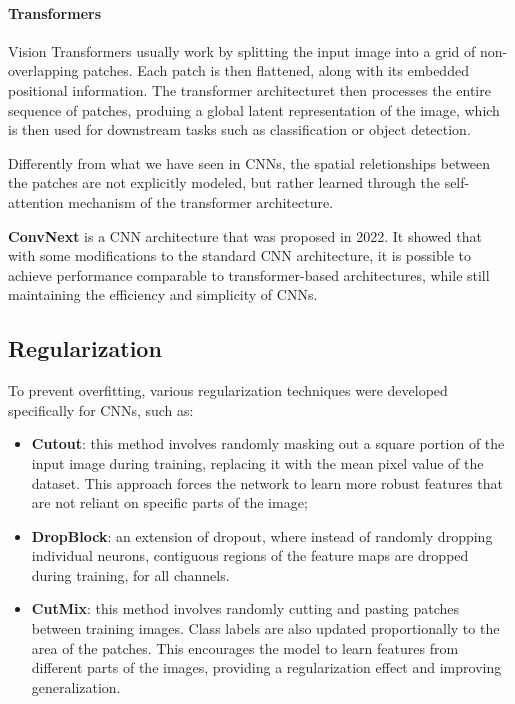 \paragraph{Transformers}
Vision Transformers usually work by splitting the input image into a grid of non-overlapping patches.
Each patch is then flattened, along with its embedded positional information. The transformer architecturet
then processes the entire sequence of patches, produing a global latent representation of the image, which
is then used for downstream tasks such as classification or object detection.

Differently from what we have seen in CNNs, the spatial reletionships between the patches are not explicitly modeled, but rather learned through the self-attention mechanism of the transformer architecture.

\textbf{ConvNext} is a CNN architecture that was proposed in 2022. It showed that with some modifications to the standard CNN architecture, it is possible to achieve performance 
comparable to transformer-based architectures, while still maintaining the efficiency and simplicity of CNNs.

\subsection{Regularization}
To prevent overfitting, various regularization techniques were developed specifically for CNNs, such as:
\begin{itemize}
    \item \textbf{Cutout}: this method involves randomly masking out a square portion of the input image during training, replacing it with the mean pixel value of the dataset.
    This approach forces the network to learn more robust features that are not reliant on specific parts of the image;
    \item \textbf{DropBlock}: an extension of dropout, where instead of randomly dropping individual neurons, contiguous regions of the feature maps are dropped during training,
    for all channels.
    \item \textbf{CutMix}: this method involves randomly cutting and pasting patches between training images.
    Class labels are also updated proportionally to the area of the patches. This encourages the model to learn features from different parts of the images,
    providing a regularization effect and improving generalization.
\end{itemize}


